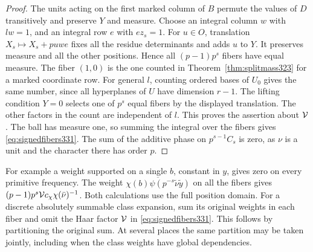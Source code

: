 \documentclass[a4paper,11pt]{article}
\theoremstyle{definition}
\theoremstyle{remark}
\numberwithin{equation}{section}
\begin{document}
\begin{proof}
The units acting on the first marked column of \(B\) permute the
values of \(D\) transitively and preserve \(Y\) and measure.
Choose an integral column \(w\) with \(lw=1\), and an integral row
\(e\) with \(ez_s=1\). For \(u\in O\), translation
\(X_s\mapsto X_s+puwe\) fixes all the residue determinants and
adds \(u\) to \(Y\). It preserves measure and all the other positions.
Hence all \((p-1)p^s\) fibers have equal measure. The fiber
\((1,0)\) is the one counted in Theorem~\ref{thm:splitmass323}
for a marked coordinate row. For general \(l\), counting ordered
bases of \(U_0\) gives the same number, since all hyperplanes of
\(U\) have dimension \(r-1\). The lifting condition \(Y=0\) selects
one of \(p^s\) equal fibers by the displayed translation. The other
factors in the count are independent of \(l\). This proves the
assertion about \({\cal V}\). The ball has measure one, so summing
the integral over the fibers gives \eqref{eq:signedfibers331}.
The sum of the additive phase on \(p^{s-1}C_s\) is zero, as \(\nu\)
is a unit and the character there has order \(p\).
\end{proof}

For example a weight supported on a single \(b\), constant in \(y\),
gives zero on every primitive frequency. The weight
\(\overline{\chi(b)\psi(p^{-s}\widetilde\nu\widetilde y)}\)
on all the fibers gives \((p-1)p^s{\cal V}c_\chi\chi(\bar\nu)^{-1}\).
Both calculations use the full position domain. For a discrete
absolutely summable class expansion, sum its original weights in
each fiber and omit the Haar factor \({\cal V}\) in
\eqref{eq:signedfibers331}. This follows by partitioning the
original sum. At several places the same partition may be taken
jointly, including when the class weights have global dependencies.
\end{document}

